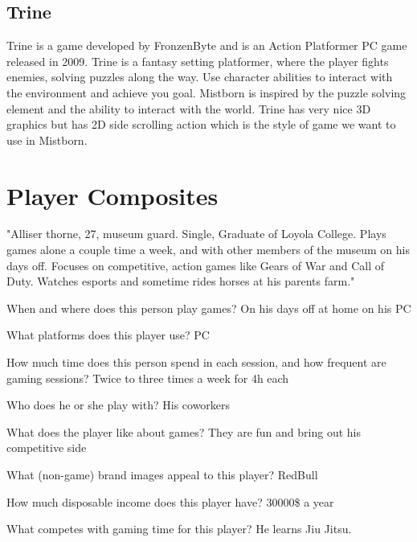 \documentclass{article}
\begin{document}
\subsection{Trine}
Trine is a game developed by FronzenByte and is an Action Platformer PC game released in 2009.
Trine is a fantasy setting platformer, where the player fights enemies, solving puzzles along the way. Use character abilities to interact with the environment and achieve you goal. Mistborn is inspired by the puzzle solving element and the ability to interact with the world. Trine has very nice 3D graphics but has 2D side scrolling action which is the style of game we want to use in Mistborn.

\section{Player Composites}

"Alliser thorne, 27, museum guard. Single, Graduate of Loyola College. Plays games alone a couple time a week, and with other members of the museum on his days off. Focuses on competitive, action games like Gears of War and Call of Duty. Watches esports and sometime rides horses at his parents farm."
\begin{description}
	\item When and where does this person play games? On his days off at home on his PC
	\item What platforms does this player use? PC 
	\item How much time does this person spend in each session, and
	how frequent are gaming sessions? Twice to three times a week for 4h each
	\item Who does he or she play with? His coworkers 
	\item What does the player like about games? They are fun and bring out his competitive side
	\item What (non-game) brand images appeal to this player? RedBull
	\item How much disposable income does this player have? 30000\$ a year
	\item What competes with gaming time for this player? He learns Jiu Jitsu.
\end{description}
\end{document}

